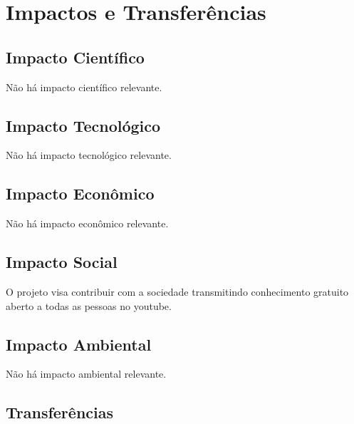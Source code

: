 \documentclass[a4paper,10pt]{article} %
\begin{document}
\section{Impactos e Transferências}

\subsection{Impacto Científico}

Não há impacto científico relevante.

\subsection{Impacto Tecnológico}

Não há impacto tecnológico relevante.

\subsection{Impacto Econômico}

Não há impacto econômico relevante.

\subsection{Impacto Social}

O projeto visa contribuir com a sociedade transmitindo conhecimento gratuito aberto a todas as pessoas no youtube.

\subsection{Impacto Ambiental}

Não há impacto ambiental relevante.

\subsection{Transferências}
\end{document}
